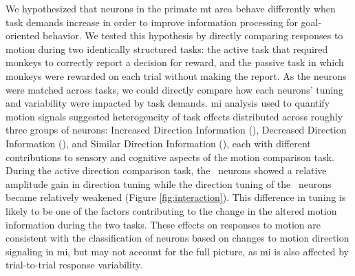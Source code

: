 We hypothesized that neurons in the primate \gls{mt} area behave differently when task demands increase in order to improve information processing for goal-oriented behavior. 
We tested this hypothesis by directly comparing responses to motion during two identically structured tasks: the active task that required monkeys to correctly report a decision for reward, and the passive task in which monkeys were rewarded on each trial without making the report. 
As the neurons were matched across tasks, we could directly compare how each neurons' tuning and variability were impacted by task demands. 
\Gls{mi} analysis used to quantify motion signals suggested heterogeneity of task effects distributed across roughly three groups of neurons: Increased Direction Information (\enhanced), Decreased Direction Information (\suppressed), and Similar Direction Information (\consistent), each with different contributions to sensory and cognitive aspects of the motion comparison task.\label{het3} 
During the active direction comparison task, the \enhanced\ neurons showed a relative amplitude gain in direction tuning while the direction tuning of the \suppressed\ neurons became relatively weakened (Figure \ref{fig:interaction}). 
This difference in tuning is likely to be one of the factors contributing to the change in the altered motion information during the two tasks. These effects on responses to motion are consistent with the classification of neurons based on changes to motion direction signaling in \gls{mi}, but may not account for the full picture, as \gls{mi} is also affected by trial-to-trial response variability.

